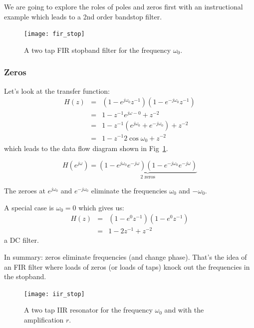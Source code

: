 \documentclass[12pt,a4paper]{article}
\begin{document}
We are going to explore the roles of poles and zeros first with
an instructional example which leads to a 2nd order bandstop filter.

\begin{figure}[!hbt]
\begin{center}
\mbox{\texttt{[image: fir\_stop]}}
\end{center}
\caption{A two tap FIR stopband filter for the frequency $\omega_0$.
\label{fir_stop}}
\end{figure}

\subsubsection{Zeros}
Let's look at the transfer function:
\begin{eqnarray}
H(z) & = & (1 - e^{j\omega_0} z^{-1})(1 - e^{-j\omega_0} z^{-1}) \\
     & = & 1 - z^{-1} e^{j \omega-{0}} + z^{-2} \\
     & = & 1 - z^{-1} (e^{j \omega_{0}} + e^{-j \omega_{0}}) + z^{-2} \\
     & = & 1 - z^{-1} 2 \cos \omega_{0} + z^{-2}
\end{eqnarray}
which leads to the data flow diagram shown in Fig~\ref{fir_stop}.

\begin{equation}
H(e^{j\omega}) = \underbrace{(1 - e^{j\omega_0}e^{-j\omega})(1 - e^{-j\omega_0} e^{-j\omega})}_{\mbox{2 zeros}}
\end{equation}

The zeroes at 
$e^{j \omega_{0}}$ and $e^{-j \omega_0}$ 
eliminate the frequencies $\omega_{0}$ and $-\omega_{0}$. 

A special case is $\omega_{0} = 0$
which gives us:
\begin{eqnarray}
H(z) & = & (1 - e^{0} z^{-1})(1 - e^{0} z^{-1}) \\
     & = & 1 - 2 z^{-1} + z^{-2}
\end{eqnarray}
a DC filter.

In summary: zeros eliminate frequencies (and change phase).
That's the idea of an FIR filter where loads of zeros (or loads of taps)
knock out the frequencies in the stopband.


\begin{figure}[!hbt]
\begin{center}
\mbox{\texttt{[image: iir\_stop]}}
\end{center}
\caption{A two tap IIR resonator for the frequency $\omega_0$ and with
the amplification $r$.
\label{iir_stop}}
\end{figure}
\end{document}
